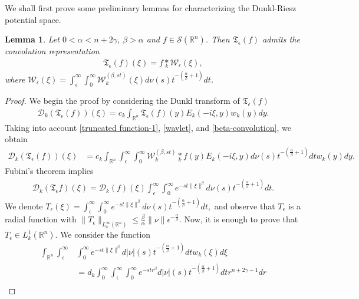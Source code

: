 \documentclass[11pt,a4paper,reqno]{amsproc}
\newtheorem{lemma}[theorem]{Lemma}
\theoremstyle{definition}
\theoremstyle{remark}
\numberwithin{equation}{section}
\begin{document}
\noindent We shall first prove some preliminary lemmas for characterizing the Dunkl-Riesz potential space.


\begin{lemma} \label{Lemma-C-1}
    Let $0< \alpha <n+2\gamma$, $\beta >\alpha$ and $f\in \mathcal{S}(\mathbb{R}^n)$. Then $\mathfrak{T}_{\epsilon}(f)$ admits the convolution representation
    \begin{align*}
      \mathfrak{T}_{\epsilon}(f) (\xi)   = f \underset{k}{\ast} \mathcal{W}_{\epsilon}(\xi),
    \end{align*} where $\mathcal{W}_{\epsilon}(\xi)= \int_{\epsilon}^\infty \int_0^\infty \mathcal{W}_k^{(\beta, st)}(\xi) d\nu(s)t^{-(\frac{\alpha}{\beta}+1)}dt$.
\end{lemma}
\begin{proof} We begin the proof by considering the Dunkl transform of $\mathfrak{T}_{\epsilon}(f)$
    \begin{align*}
        \mathcal{D}_k(\mathfrak{T}_{\epsilon}(f))(\xi)= c_k \int_{\mathbb{R}^n} \mathfrak{T}_{\epsilon}(f)(y)E_k(-i\xi,y)w_k(y)dy.
    \end{align*}
 Taking into account \eqref{truncated function-1}, \eqref{wavlet}, and \eqref{beta-convolution}, we obtain
 \begin{align*}
     \mathcal{D}_k(\mathfrak{T}_{\epsilon}(f))(\xi) &= c_k  \int_{\mathbb{R}^n}  \int_{\epsilon}^\infty \int_0^\infty  
    \mathcal{W}_k^{(\beta,st)}\underset{k}{\ast}
    f(y)E_k(-i\xi,y)d\nu(s)t^{-(\frac{\alpha}{\beta}+1)}dt w_k(y)dy. 
 \end{align*}
 Fubini's theorem implies
 \begin{align} \label{Truncation-1}
     \mathcal{D}_k(\mathfrak{T}_{\epsilon}f)(\xi)=\mathcal{D}_k(f)(\xi) \int_{\epsilon}^\infty \int_0^\infty e^{-st\|\xi\|^\beta}  d\nu(s)t^{-(\frac{\alpha}{\beta}+1)}dt.
 \end{align} We denote $T_\epsilon(\xi)=  \int_{\epsilon}^\infty \int_0^\infty e^{-st\|\xi\|^\beta}  d\nu(s)t^{-(\frac{\alpha}{\beta}+1)}dt,$ and observe that 
 $T_\epsilon$ is a radial function with
 $\|T_\epsilon\|_{L_k^{\infty}(\mathbb{R}^n)} \leq \frac{\beta}{\alpha} \|\nu\|  \epsilon^{-\frac{\alpha}{\beta}}$. Now, it is enough to prove that $T_\epsilon \in L_k^1(\mathbb{R}^n)$. We consider the function 
 \begin{align*}
     \int_{\mathbb{R}^n} \int_{\epsilon}^\infty& \int_0^\infty e^{-st\|\xi\|^\beta}  d|\nu|(s)t^{-(\frac{\alpha}{\beta}+1)}dt w_k(\xi)d\xi \\ &= d_k\int_0^\infty \int_{\epsilon}^\infty \int_0^\infty e^{-st r^\beta}  d|\nu|(s)t^{-(\frac{\alpha}{\beta}+1)}dt r^{n+2\gamma-1}dr\\

\end{align*}
\end{proof}
\end{document}
